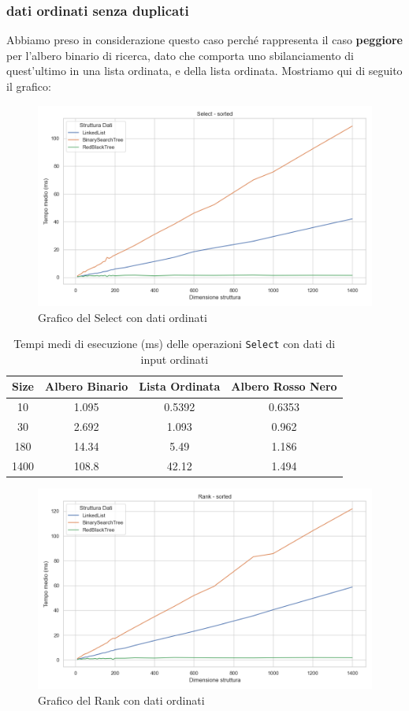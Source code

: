 \documentclass[10pt]{article}
\begin{document}
\subsubsection{dati ordinati senza duplicati}
Abbiamo preso in considerazione questo caso perché rappresenta il caso \textbf{peggiore} per l'albero binario di ricerca, dato che comporta uno sbilanciamento di quest'ultimo in una lista ordinata, e della lista ordinata. Mostriamo qui di seguito il grafico:
\begin{figure}[H]
    \centering
    \includegraphics[width=0.8\linewidth]{plots/confronto/sorted_select.png}
    \caption{Grafico del Select con dati ordinati}
    \label{confronto-select-sorted}
\end{figure}
\begin{table}[H]
\centering
\begin{tabular}{|c|c|c|c|}
\hline
\textbf{Size} & \textbf{Albero Binario} & \textbf{Lista Ordinata} & \textbf{Albero Rosso Nero} \\
\hline
10     & 1.095 & 0.5392 & 0.6353 \\
30     & 2.692 & 1.093  & 0.962 \\
180    & 14.34 & 5.49  & 1.186 \\
1400   & 108.8 & 42.12  & 1.494 \\
\hline
\end{tabular}
\caption{Tempi medi di esecuzione (ms) delle operazioni \texttt{Select} con dati di input ordinati}
\label{tab:confronto-select-sorted}
\end{table}
\begin{figure}[H]
    \centering
    \includegraphics[width=0.8\linewidth]{plots/confronto/sorted_rank.png}
    \caption{Grafico del Rank con dati ordinati}
    \label{confronto-rank-sorted}
\end{figure}
\end{document}
